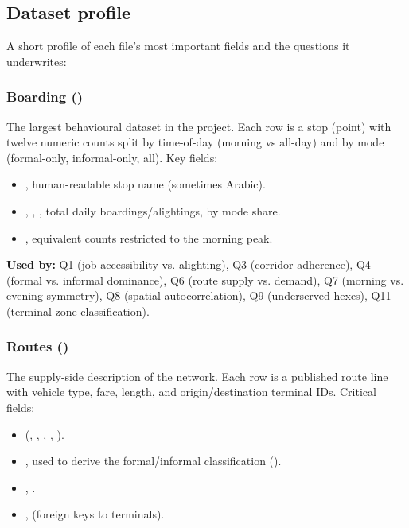 \subsection{Dataset profile}

A short profile of each file's most important fields and the questions
it underwrites:

\subsubsection{Boarding ()}

The largest behavioural dataset in the project. Each row is a stop
(point) with twelve numeric counts split by time-of-day (morning vs
all-day) and by mode (formal-only, informal-only, all). Key fields:

\begin{itemize}
 \item {}, human-readable stop name (sometimes Arabic).
 \item {}, , 
, total daily boardings/alightings, by mode share.
 \item {}, equivalent counts restricted to the morning
 peak.
\end{itemize}

\textbf{Used by:} Q1 (job accessibility vs. alighting), Q3 (corridor
adherence), Q4 (formal vs. informal dominance), Q6 (route supply vs.
demand), Q7 (morning vs. evening symmetry), Q8 (spatial autocorrelation),
Q9 (underserved hexes), Q11 (terminal-zone classification).

\subsubsection{Routes ()}

The supply-side description of the network. Each row is a published
route line with vehicle type, fare, length, and origin/destination
terminal IDs. Critical fields:

\begin{itemize}
 \item {} (, , , , ).
 \item {}, used to derive the formal/informal
 classification ().
 \item {}, .
 \item {},  (foreign keys to terminals).
\end{itemize}

